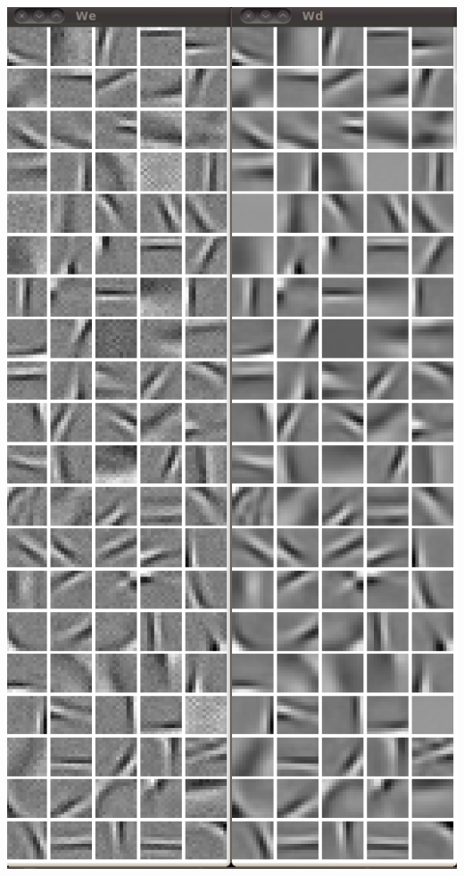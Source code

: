 \documentclass{beamer}
\begin{document}
\begin{frame}
\begin{center} 
\includegraphics[scale = 0.25]{Wshrink.png}
\end{center} 
\end{frame} 
\end{document}
